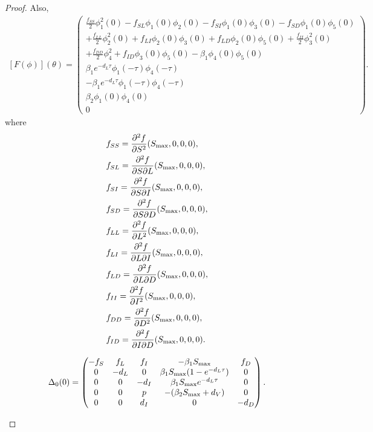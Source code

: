 \documentclass{CMHPhD-SIVD}
\begin{document}
\begin{proof}
Also,
\begin{align}\label{27}
     [F(\phi)](\theta)=
     \begin{pmatrix}
     \frac{f_{SS}}{2}\phi_1^2(0)-f_{SL}\phi_1(0)\phi_2(0)-f_{SI}\phi_1(0)\phi_3(0)-f_{SD}\phi_1(0)\phi_5(0)\\+\frac{f_{LL}}{2}\phi_2^2(0)+f_{LI}\phi_2(0)\phi_3(0)+f_{LD}\phi_2(0)\phi_5(0)+\frac{f_{II}}{2}\phi_3^2(0)\\+\frac{f_{DD}}{2}\phi_4^2+f_{ID}\phi_3(0)\phi_5(0)-\beta_1\phi_4(0)\phi_5(0)\\
     \beta_1 e^{-d_L \tau} \phi_1(-\tau) \phi_4(-\tau)  \\
     -\beta_1 e^{-d_L \tau} \phi_1(-\tau) \phi_4(-\tau)  \\
     \beta_2 \phi_1(0) \phi_4(0)  \\
     0
     \end{pmatrix}.
\end{align}
where
\begin{align*}
 &f_{SS}=\frac{\partial^2 f}{\partial S^2} (S_{\text{max}}, 0, 0, 0),\\
 &f_{SL}=\frac{\partial^2 f}{\partial S\partial L} (S_{\text{max}}, 0, 0, 0),\\
 &f_{SI}=\frac{\partial^2 f}{\partial S\partial I} (S_{\text{max}}, 0, 0,0),\\
 &f_{SD}=\frac{\partial^2 f}{\partial S\partial D} (S_{\text{max}}, 0, 0,0),\\
 &f_{LL}=\frac{\partial^2 f}{\partial L^2} (S_{\text{max}}, 0, 0, 0),\\
 &f_{LI}=\frac{\partial^2 f}{\partial L\partial I} (S_{\text{max}}, 0, 0,0),\\
 &f_{LD}=\frac{\partial^2 f}{\partial L\partial D} (S_{\text{max}}, 0, 0,0),\\
 &f_{II}=\frac{\partial^2 f}{\partial I^2} (S_{\text{max}}, 0, 0, 0),\\
 &f_{DD}=\frac{\partial^2 f}{\partial D^2} (S_{\text{max}}, 0, 0, 0),\\
 &f_{ID}=\frac{\partial^2 f}{\partial I\partial D} (S_{\text{max}}, 0, 0,0).
\end{align*}

\begin{small}
\begin{equation}\label{28}
     \Delta_0(0)=
     \begin{pmatrix}
       -f_S & f_L & f_I & -\beta_1 S_{\text{max}} & f_D \\
       0 & -d_L & 0  & \beta_1 S_{\text{max}}(1-e^{-d_L \tau}) & 0\\
       0 & 0 &  -d_I & \beta_1 S_{\text{max}} e^{-d_L \tau} & 0 \\
       0 & 0 & p & -(\beta_2 S_{\text{max}}+d_V) & 0 \\
       0 & 0 & d_I & 0 & -d_D
     \end{pmatrix} .
\end{equation}
\end{small}


\end{proof}
\end{document}
